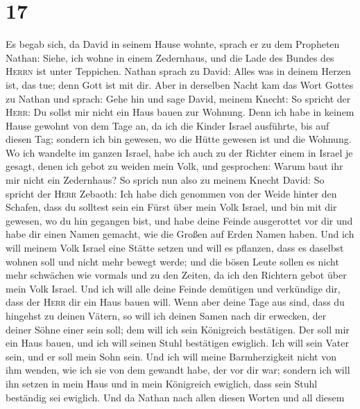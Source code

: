 \hypertarget{section-16}{%
\section{17}\label{section-16}}

 Es begab sich, da David in seinem Hause wohnte, sprach er
zu dem Propheten Nathan: Siehe, ich wohne in einem Zedernhaus, und die
Lade des Bundes des \textsc{Herrn} ist unter Teppichen. 
Nathan sprach zu David: Alles was in deinem Herzen ist, das tue; denn
Gott ist mit dir.  Aber in derselben Nacht kam das Wort
Gottes zu Nathan und sprach:  Gehe hin und sage David,
meinem Knecht: So spricht der \textsc{Herr}: Du sollst mir nicht ein
Haus bauen zur Wohnung.  Denn ich habe in keinem Hause
gewohnt von dem Tage an, da ich die Kinder Israel ausführte, bis auf
diesen Tag; sondern ich bin gewesen, wo die Hütte gewesen ist und die
Wohnung.  Wo ich wandelte im ganzen Israel, habe ich auch
zu der Richter einem in Israel je gesagt, denen ich gebot zu weiden mein
Volk, und gesprochen: Warum baut ihr mir nicht ein Zedernhaus?
 So sprich nun also zu meinem Knecht David: So spricht der
\textsc{Herr} Zebaoth: Ich habe dich genommen von der Weide hinter den
Schafen, dass du solltest sein ein Fürst über mein Volk Israel,
 und bin mit dir gewesen, wo du hin gegangen bist, und
habe deine Feinde ausgerottet vor dir und habe dir einen Namen gemacht,
wie die Großen auf Erden Namen haben.  Und ich will meinem
Volk Israel eine Stätte setzen und will es pflanzen, dass es daselbst
wohnen soll und nicht mehr bewegt werde; und die bösen Leute sollen es
nicht mehr schwächen wie vormals und zu den Zeiten, da ich den Richtern
gebot über mein Volk Israel.  Und ich will alle deine
Feinde demütigen und verkündige dir, dass der \textsc{Herr} dir ein Haus
bauen will.  Wenn aber deine Tage aus sind, dass du
hingehst zu deinen Vätern, so will ich deinen Samen nach dir erwecken,
der deiner Söhne einer sein soll; dem will ich sein Königreich
bestätigen.  Der soll mir ein Haus bauen, und ich will
seinen Stuhl bestätigen ewiglich.  Ich will sein Vater
sein, und er soll mein Sohn sein. Und ich will meine Barmherzigkeit
nicht von ihm wenden, wie ich sie von dem gewandt habe, der vor dir war;
 sondern ich will ihn setzen in mein Haus und in mein
Königreich ewiglich, dass sein Stuhl beständig sei ewiglich.
 Und da Nathan nach allen diesen Worten und all diesem
